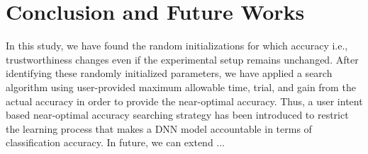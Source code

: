 \section{Conclusion and Future Works}
\label{sec:future}
In this study, we have found the random initializations for which accuracy i.e., trustworthiness changes even if the experimental setup remains unchanged. After identifying these randomly initialized parameters, we have applied a search algorithm using user-provided maximum allowable time, trial, and gain from the actual accuracy in order to provide the near-optimal accuracy.
Thus, a user intent based near-optimal accuracy searching strategy has been introduced to restrict the learning process that makes a DNN model accountable in terms of classification accuracy. In future, we can extend ...
